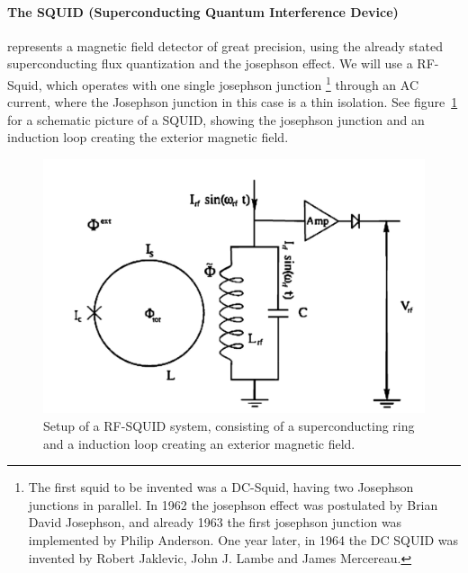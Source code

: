 \paragraph{The SQUID (Superconducting Quantum Interference Device)} represents a magnetic field
detector of great precision, using the already stated superconducting flux quantization and
the josephson effect. We will use a RF-Squid, which operates with one single josephson junction%
\footnote{The first squid to be invented was a DC-Squid, having two Josephson junctions in parallel. In 1962
the josephson effect was postulated by Brian David Josephson, and already 1963 the first josephson junction
was implemented by Philip Anderson. One year later, in 1964 the DC SQUID was invented by Robert Jaklevic, John J. Lambe
and James Mercereau.} through an AC current, where the Josephson junction in this case is a thin isolation. 
See figure~\ref{fig:squid1} for a schematic picture of a SQUID, showing the josephson junction and 
an induction loop creating the exterior magnetic field.
\begin{figure}[H]
    \centering
    \includegraphics[width=1\linewidth]{figures/squid1}
    \caption{Setup of a RF-SQUID system, consisting of a superconducting ring and a induction loop creating
    an exterior magnetic field.}
    \label{fig:squid1}
\end{figure}


